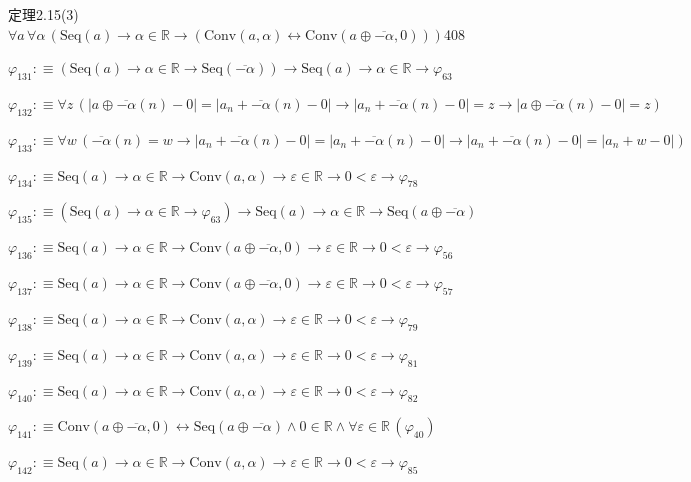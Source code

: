 \begin{fullproof}{定理2.15(3)}{$\forall a\,\forall \alpha\,(\mathrm{Seq}(a) \to \alpha \in \mathbb{R} \to (\mathrm{Conv}(a,\alpha) \leftrightarrow \mathrm{Conv}(a \oplus \overline{-\alpha},0)))$}{408}
\begin{abbrevlist}
\item $\varphi_{131} :\equiv (\mathrm{Seq}(a) \to \alpha \in \mathbb{R} \to \mathrm{Seq}(\overline{-\alpha})) \to \mathrm{Seq}(a) \to \alpha \in \mathbb{R} \to \varphi_{63}$
\item $\varphi_{132} :\equiv \forall z\,(\lvert a \oplus \overline{-\alpha}(n) - 0 \rvert = \lvert a_{n} + \overline{-\alpha}(n) - 0 \rvert \to \lvert a_{n} + \overline{-\alpha}(n) - 0 \rvert = z \to \lvert a \oplus \overline{-\alpha}(n) - 0 \rvert = z)$
\item $\varphi_{133} :\equiv \forall w\,(\overline{-\alpha}(n) = w \to \lvert a_{n} + \overline{-\alpha}(n) - 0 \rvert = \lvert a_{n} + \overline{-\alpha}(n) - 0 \rvert \to \lvert a_{n} + \overline{-\alpha}(n) - 0 \rvert = \lvert a_{n} + w - 0 \rvert)$
\item $\varphi_{134} :\equiv \mathrm{Seq}(a) \to \alpha \in \mathbb{R} \to \mathrm{Conv}(a,\alpha) \to \varepsilon \in \mathbb{R} \to 0 < \varepsilon \to \varphi_{78}$
\item $\varphi_{135} :\equiv (\mathrm{Seq}(a) \to \alpha \in \mathbb{R} \to \varphi_{63}) \to \mathrm{Seq}(a) \to \alpha \in \mathbb{R} \to \mathrm{Seq}(a \oplus \overline{-\alpha})$
\item $\varphi_{136} :\equiv \mathrm{Seq}(a) \to \alpha \in \mathbb{R} \to \mathrm{Conv}(a \oplus \overline{-\alpha},0) \to \varepsilon \in \mathbb{R} \to 0 < \varepsilon \to \varphi_{56}$
\item $\varphi_{137} :\equiv \mathrm{Seq}(a) \to \alpha \in \mathbb{R} \to \mathrm{Conv}(a \oplus \overline{-\alpha},0) \to \varepsilon \in \mathbb{R} \to 0 < \varepsilon \to \varphi_{57}$
\item $\varphi_{138} :\equiv \mathrm{Seq}(a) \to \alpha \in \mathbb{R} \to \mathrm{Conv}(a,\alpha) \to \varepsilon \in \mathbb{R} \to 0 < \varepsilon \to \varphi_{79}$
\item $\varphi_{139} :\equiv \mathrm{Seq}(a) \to \alpha \in \mathbb{R} \to \mathrm{Conv}(a,\alpha) \to \varepsilon \in \mathbb{R} \to 0 < \varepsilon \to \varphi_{81}$
\item $\varphi_{140} :\equiv \mathrm{Seq}(a) \to \alpha \in \mathbb{R} \to \mathrm{Conv}(a,\alpha) \to \varepsilon \in \mathbb{R} \to 0 < \varepsilon \to \varphi_{82}$
\item $\varphi_{141} :\equiv \mathrm{Conv}(a \oplus \overline{-\alpha},0) \leftrightarrow \mathrm{Seq}(a \oplus \overline{-\alpha}) \land 0 \in \mathbb{R} \land \forall \varepsilon \in \mathbb{R}\,(\varphi_{40})$
\item $\varphi_{142} :\equiv \mathrm{Seq}(a) \to \alpha \in \mathbb{R} \to \mathrm{Conv}(a,\alpha) \to \varepsilon \in \mathbb{R} \to 0 < \varepsilon \to \varphi_{85}$

\end{abbrevlist}
\end{fullproof}
